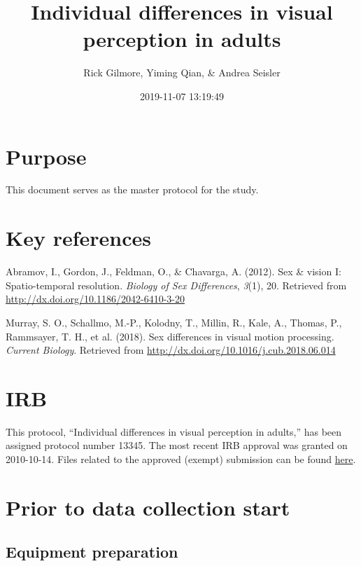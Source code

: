 \documentclass[]{article}
\title{Individual differences in visual perception in adults}
\author{Rick Gilmore, Yiming Qian, \& Andrea Seisler}
\date{2019-11-07 13:19:49}
\begin{document}
\maketitle

{
\setcounter{tocdepth}{2}
\tableofcontents
}
\hypertarget{purpose}{%
\section{Purpose}\label{purpose}}

This document serves as the master protocol for the study.

\hypertarget{key-references}{%
\section{Key references}\label{key-references}}

Abramov, I., Gordon, J., Feldman, O., \& Chavarga, A. (2012). Sex \&
vision I: Spatio-temporal resolution. \emph{Biology of Sex Differences},
\emph{3}(1), 20. Retrieved from
\url{http://dx.doi.org/10.1186/2042-6410-3-20}

Murray, S. O., Schallmo, M.-P., Kolodny, T., Millin, R., Kale, A.,
Thomas, P., Rammsayer, T. H., et al. (2018). Sex differences in visual
motion processing. \emph{Current Biology}. Retrieved from
\url{http://dx.doi.org/10.1016/j.cub.2018.06.014}

\hypertarget{irb}{%
\section{IRB}\label{irb}}

This protocol, ``Individual differences in visual perception in
adults,'' has been assigned protocol number 13345. The most recent IRB
approval was granted on 2010-10-14. Files related to the approved
(exempt) submission can be found \href{../irb/2019-10-24}{here}.

\hypertarget{prior-to-data-collection-start}{%
\section{Prior to data collection
start}\label{prior-to-data-collection-start}}

\hypertarget{equipment-preparation}{%
\subsection{Equipment preparation}\label{equipment-preparation}}
\end{document}
